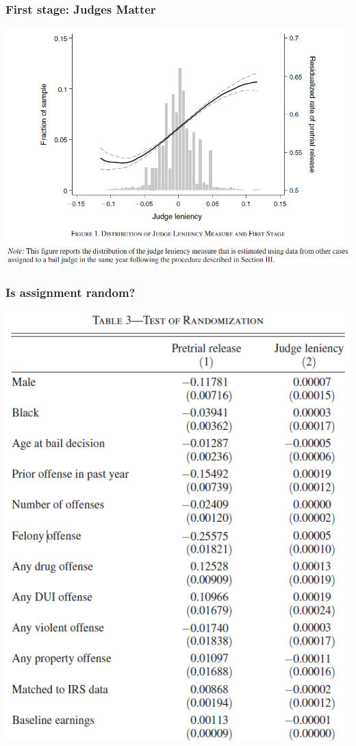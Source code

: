 \begin{frame}
  \frametitle{First stage: Judges Matter}
  \begin{center}
    \includegraphics[width=.9\textwidth]{./resources/DobbieFirstStageGraph}
  \end{center}  
\end{frame}

\begin{frame}
  \frametitle{Is assignment random?}
  \begin{center}
    \includegraphics[width=.9\textwidth]{./resources/DobbieRandomization}
  \end{center}  
\end{frame}

